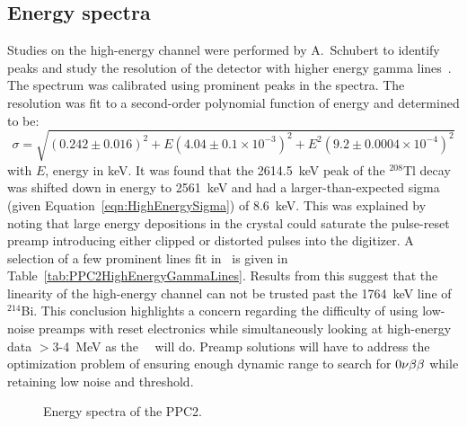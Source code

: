 	    	\subsection{Energy spectra}
		\label{sec:DeploymentPPC2SoudanAnalysisEnergySpectra}    	
			
	Studies on the high-energy channel were performed by A.~Schubert to identify peaks and study the resolution of the detector with higher energy gamma lines~\cite{Schubert:2009ff}.  The spectrum was calibrated using prominent peaks in the spectra.  The resolution was fit to a second-order polynomial function of energy and determined to be:
				\begin{equation}
					\sigma = \sqrt{(0.242 \pm 0.016)^{2} +  E (4.04 \pm 0.1 \times 10^{-3})^{2} + E^{2} (9.2 \pm 0.0004 \times 10^{-4})^{2}} 
				\label{eqn:HighEnergySigma}
				\end{equation}			
with $E$, energy in keV.  It was found that the 2614.5~keV peak of the $^{208}$Tl decay was shifted down in energy to 2561~keV and had a larger-than-expected sigma (given Equation~\ref{eqn:HighEnergySigma}) of 8.6~keV.  This was explained by noting that large energy depositions in the crystal could saturate the pulse-reset preamp introducing either clipped or distorted pulses into the digitizer.  A selection of a few prominent lines fit in~\cite{Schubert:2009ff} is given in Table~\ref{tab:PPC2HighEnergyGammaLines}.  Results from this suggest that the linearity of the high-energy channel can not be trusted past the 1764~keV line of $^{214}$Bi.  This conclusion highlights a concern regarding the difficulty of using low-noise preamps with reset electronics while simultaneously looking at high-energy data $>$3-4~MeV as the \MJ~\minmod~will do.  Preamp solutions will have to address the optimization problem of ensuring enough dynamic range to search for $0 \nu \beta \beta$ while retaining low noise and threshold.  
	
				\begin{figure}
					\centering
					\caption{Energy spectra of the PPC2.}
					\label{fig:PPC2EnergySpectra}
				\end{figure}	
	
